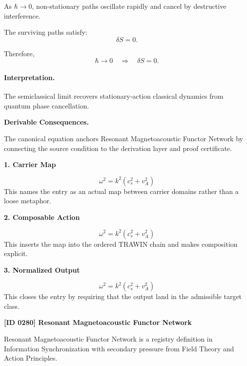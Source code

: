 As $\hbar\to 0$, non-stationary paths oscillate rapidly and cancel by destructive interference.

The surviving paths satisfy:
\begin{equation}
\delta S=0 .
\end{equation}

Therefore,
\begin{equation}
\boxed{
\hbar\rightarrow 0
\quad\Longrightarrow\quad
\delta S=0 .
}
\end{equation}

\paragraph{Interpretation.}
The semiclassical limit recovers stationary-action classical dynamics from quantum phase cancellation.

\par\vspace{0.35em}
\noindent\textbf{Derivable Consequences.}\quad
\begingroup
\footnotesize
\raggedright
The canonical equation anchors Resonant Magnetoacoustic Functor Network by connecting the source condition to the derivation layer and proof certificate.
\par\endgroup

\noindent\textbf{1. Carrier Map}\par
\[
\omega^2=k^2(c_s^2+v_A^2)
\]
\noindent This names the entry as an actual map between carrier domains rather than a loose metaphor.\par
\noindent\textbf{2. Composable Action}\par
\[
\omega^2=k^2(c_s^2+v_A^2)
\]
\noindent This inserts the map into the ordered TRAWIN chain and makes composition explicit.\par
\noindent\textbf{3. Normalized Output}\par
\[
\omega^2=k^2(c_s^2+v_A^2)
\]
\noindent This closes the entry by requiring that the output land in the admissible target class.\par

\clearpage
\noindent\textbf{[ID 0280] Resonant Magnetoacoustic Functor Network}\par
\vspace{0.35em}
\begingroup\small
{}
Resonant Magnetoacoustic Functor Network is a registry definition in Information Synchronization with secondary pressure from Field Theory and Action Principles.

